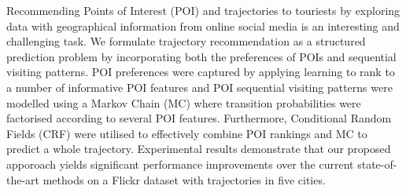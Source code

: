 Recommending Points of Interest (POI) and trajectories to touriests by exploring data with 
geographical information from online social media is an interesting and challenging task.
We formulate trajectory recommendation as a structured prediction problem by incorporating 
both the preferences of POIs and sequential visiting patterns.
POI preferences were captured by applying learning to rank to a number of informative POI features
and POI sequential visiting patterns were modelled using a Markov Chain (MC) where transition 
probabilities were factorised according to several POI features.
Furthermore, Conditional Random Fields (CRF) were utilised to effectively combine POI rankings
and MC to predict a whole trajectory.
Experimental results demonstrate that our proposed apporoach yields significant performance improvements 
over the current state-of-the-art methods on a Flickr dataset with trajectories in five cities.
